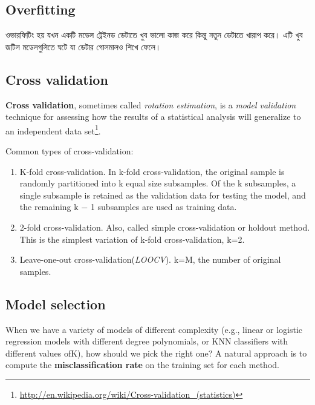 \documentclass[graybox, envcountchap, twocolumn]{styles/svmult}
\begin{document}
\subsection{Overfitting}

ওভারফিটিং হয় যখন একটি মডেল ট্রেইনড ডেটাতে খুব ভালো কাজ করে কিন্তু নতুন ডেটাতে খারাপ করে। এটি খুব জটিল মডেলগুলিতে ঘটে যা ডেটার গোলমালও শিখে ফেলে।

\subsection{Cross validation}
\label{sec:Cross-validation}
\begin{definition}
\textbf{Cross validation}, sometimes called \emph{rotation estimation}, is a \emph{model validation} technique for assessing how the results of a statistical analysis will generalize to an independent data set\footnote{\url{http://en.wikipedia.org/wiki/Cross-validation_(statistics)}}.
\end{definition}

Common types of cross-validation:
\begin{enumerate}
\item K-fold cross-validation. In k-fold cross-validation, the original sample is randomly partitioned into k equal size subsamples. Of the k subsamples, a single subsample is retained as the validation data for testing the model, and the remaining k − 1 subsamples are used as training data.
\item 2-fold cross-validation. Also, called simple cross-validation or holdout method. This is the simplest variation of k-fold cross-validation, k=2.
\item Leave-one-out cross-validation(\emph{LOOCV}). k=M, the number of original samples.
\end{enumerate}


\subsection{Model selection}

When we have a variety of models of different complexity (e.g., linear or logistic regression models with different degree polynomials, or KNN classifiers with different values ofK), how should we pick the right one? A natural approach is to compute the \textbf{misclassification rate} on the training set for each method.
\end{document}
